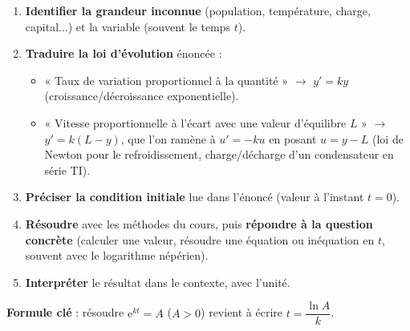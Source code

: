 \documentclass[11pt]{article}
\begin{document}
\begin{methode}
\begin{enumerate}
\item \textbf{Identifier la grandeur inconnue} (population, température, charge, capital...) et la variable (souvent le temps $t$).
\item \textbf{Traduire la loi d'évolution} énoncée :
\begin{itemize}
\item « Taux de variation proportionnel à la quantité » $\rightarrow$ $y' = ky$ (croissance/décroissance exponentielle).
\item « Vitesse proportionnelle à l'écart avec une valeur d'équilibre $L$ » $\rightarrow$ $y' = k(L - y)$, que l'on ramène à $u' = -ku$ en posant $u = y - L$ (loi de Newton pour le refroidissement, charge/décharge d'un condensateur en série TI).
\end{itemize}
\item \textbf{Préciser la condition initiale} lue dans l'énoncé (valeur à l'instant $t = 0$).
\item \textbf{Résoudre} avec les méthodes du cours, puis \textbf{répondre à la question concrète} (calculer une valeur, résoudre une équation ou inéquation en $t$, souvent avec le logarithme népérien).
\item \textbf{Interpréter} le résultat dans le contexte, avec l'unité.
\end{enumerate}
\textbf{Formule clé} : résoudre $\mathrm{e}^{kt} = A$ ($A>0$) revient à écrire $t = \dfrac{\ln A}{k}$.
\end{methode}
\end{document}
